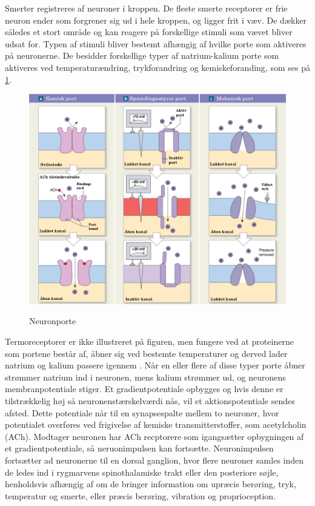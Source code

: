 Smerter registreres af neuroner i kroppen. De fleste smerte receptorer er frie neuron ender som forgrener sig ud i hele kroppen, og ligger frit i væv. De dækker således et stort område og kan reagere på forskellige stimuli som vævet bliver udsat for. Typen af stimuli bliver bestemt afhængig af hvilke porte som aktiveres på neuronerne. De besidder forskellige typer af natrium-kalium porte som aktiveres ved temperaturændring, trykforandring og kemiskeforanding, som ses på \ref{neuronport}.

\begin{figure}[H]
	\caption{Neuronporte}
	\label{neuronport}
	\centering
	\includegraphics[scale=.8]{figures/neuronport}
	\flushleft
	\textit{\citep{Martini}}
\end{figure}

Termoreceptorer er ikke illustreret på figuren, men fungere ved at proteinerne som portene består af, åbner sig ved bestemte temperaturer og derved lader natrium og kalium passere igennem \citep{kimball}. 
Når en eller flere af disse typer porte åbner strømmer natrium ind i neuronen, mens kalium strømmer ud, og neuronens membranpotentiale stiger. Et gradientpotentiale opbygges og hvis denne er tilstrækkelig høj så neuronenstærskelværdi nås, vil et aktionspotentiale sendes afsted. Dette potentiale når til en synapsespalte mellem to neuroner, hvor potentialet overføres ved frigivelse af kemiske transmitterstoffer, som acetylcholin (ACh). Modtager neuronen har ACh recptorere som igangsætter opbygningen af et gradientpotentiale, så neruonimpulsen kan fortsætte.
Neuronimpulsen fortsætter ad neuronerne til en dorsal ganglion, hvor flere neuroner samles inden de ledes ind i rygmarvens spinothalamiske trakt eller den posteriore søjle, henholdsvis afhængig af om de bringer information om upræcis berøring, tryk, temperatur og smerte, eller præcis berøring, vibration og proprioception. \citep{Martini}

